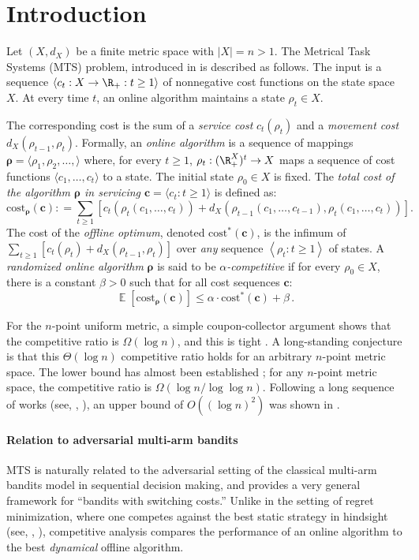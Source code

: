 \documentclass{toc}
\newcommand{\cost}{\mathrm{cost}}
\newcommand{\seteq}{\mathrel{\mathop:}=}
\newcommand{\llangle}{\left\langle}
\newcommand{\rrangle}{\right\rangle}
\DeclareMathOperator*{\Exp}{\mathbb{E}}
\begin{document}
\section{Introduction}

Let $(X,d_X)$ be a finite metric space with $|X|=n > 1$. The Metrical Task
Systems (MTS) problem, introduced in \cite{BLS92} is described as follows.
The input is a sequence $\langle c_t : X \rightarrow \R_+ : t \geq 1\rangle$ of
nonnegative cost functions on the state space $X$.
At every time $t$, an online algorithm maintains
a state $\rho_t \in X$.

The corresponding cost is the sum of a \emph{service cost} $c_t(\rho_t)$ and a
\emph{movement cost} $d_X(\rho_{t-1}, \rho_t)$.
Formally, an \emph{online algorithm} is a sequence of mappings
$\bm{\rho} = \langle \rho_1, \rho_2, \ldots, \rangle$
where, for every $t \geq 1$,
$\rho_t : (\R_+^X)^t \to X$ maps a sequence of cost functions $\langle c_1, \ldots, c_t\rangle$
to a state. The initial state $\rho_0 \in X$ is fixed. The \emph{total cost of the algorithm $\bm{\rho}$ in servicing $\bm{c} = \langle c_t : t \geq 1\rangle$} is defined as:
\[
\cost_{\bm{\rho}}(\bm{c}) \seteq \sum_{t \geq 1} \left[c_t\!\left(\rho_t(c_1,\ldots, c_t)\right) + d_X\!\left(\rho_{t-1}(c_1,\ldots, c_{t-1}), \rho_t(c_1,\ldots, c_t)\right)\right].
\]
The cost of the \emph{offline optimum}, denoted $\cost^*(\bm{c})$, is the infimum of
$\sum_{t \geq 1} [c_t(\rho_t)+d_X(\rho_{t-1},\rho_t)]$ over \emph{any} sequence
$\llangle \rho_t : t \geq 1\rrangle$ of states.
A \emph{randomized online algorithm} $\bm{\rho}$  is said to be \emph{$\alpha$-competitive}
if for every $\rho_0 \in X$, there is a constant $\beta > 0$ such that for all
cost sequences $\bm{c}$:
\[
\Exp\left[\cost_{\bm{\rho}}(\bm{c})\right] \leq \alpha \cdot \cost^*(\bm{c}) + \beta\,.
\]

For the $n$-point uniform metric,
a simple coupon-collector argument shows that the competitive ratio is $\Omega(\log n)$, and this is tight \cite{BLS92}. A long-standing conjecture is that this $\Theta(\log n)$ competitive ratio holds for an arbitrary $n$-point metric space.
The lower bound has almost been established \cite{BBM06,BLMN05};
for any $n$-point metric space, the competitive ratio is $\Omega(\log n / \log \log n)$.
Following a long sequence of works (see, \eg, \cite{Sei99,BKRS00,BBBT97,Bar96,FM03,FRT04}),
an upper bound of $O((\log n)^2)$ was shown in \cite{BCLL19}.

\paragraph{Relation to adversarial multi-arm bandits}
MTS is naturally related to the adversarial setting of the
classical multi-arm bandits model in sequential decision making,
and provides a very general framework for ``bandits with switching costs.''
Unlike in the setting of regret minimization, where one competes
against the best static strategy in hindsight (see, \eg, \cite{BN12}),
competitive analysis compares the performance of an online algorithm
to the best \emph{dynamical} offline algorithm.
\end{document}
